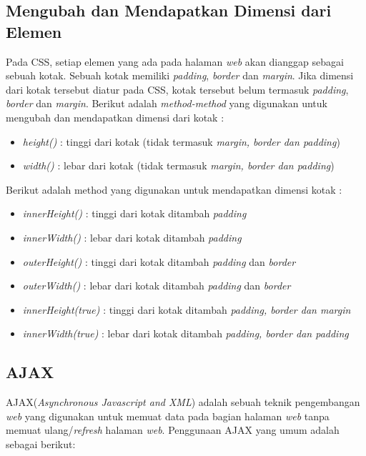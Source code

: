 \subsection{Mengubah dan Mendapatkan Dimensi dari Elemen}
Pada CSS, setiap elemen yang ada pada halaman \textit{web} akan dianggap sebagai sebuah kotak. Sebuah kotak memiliki \textit{padding}, \textit{border} dan \textit{margin}. Jika dimensi dari kotak tersebut diatur pada CSS, kotak tersebut belum termasuk \textit{padding}, \textit{border} dan \textit{margin}.
Berikut adalah \textit{method-method} yang digunakan untuk mengubah dan mendapatkan dimensi dari kotak :

\begin{itemize}
	\item \textit{height()} : tinggi dari kotak (tidak termasuk \textit{margin, border dan padding})
	\item \textit{width()} : lebar dari kotak (tidak termasuk \textit{margin, border dan padding})
\end{itemize}

Berikut adalah method yang digunakan untuk mendapatkan dimensi kotak :

\begin{itemize}
	\item \textit{innerHeight()} : tinggi dari kotak ditambah \textit{padding}
	\item \textit{innerWidth()} : lebar dari kotak ditambah \textit{padding}
	\item \textit{outerHeight()} : tinggi dari kotak ditambah \textit{padding} dan \textit{border}
	\item \textit{outerWidth()} : lebar dari kotak ditambah \textit{padding} dan \textit{border}
	\item \textit{innerHeight(true)} : tinggi dari kotak ditambah \textit{padding, border dan margin}
	\item \textit{innerWidth(true)} : lebar dari kotak ditambah \textit{padding, border dan padding}
\end{itemize}

\subsection{AJAX}
AJAX(\textit{Asynchronous Javascript and XML}) adalah sebuah teknik pengembangan \textit{web} yang digunakan untuk memuat data pada bagian halaman \textit{web} tanpa memuat ulang/\textit{refresh} halaman \textit{web}. Penggunaan AJAX yang umum adalah sebagai berikut:

